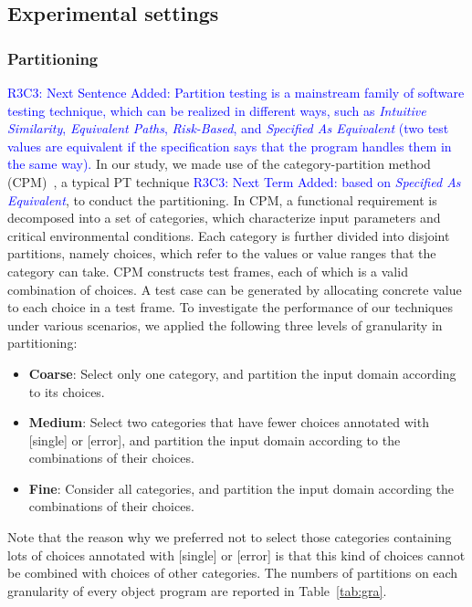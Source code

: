 \documentclass[10pt,journal,compsoc]{IEEEtran}
\begin{document}
\subsection{Experimental settings}

\subsubsection{Partitioning}

\textcolor{blue}{R3C3: Next Sentence Added: Partition testing is a mainstream family of software testing technique, which can be realized in different ways, such as \emph{Intuitive Similarity}, \emph{Equivalent Paths}, \emph{Risk-Based}, and \emph{Specified As Equivalent} (two test values are equivalent if the specification says that the program handles them in the same way).} In our study, we made use of the category-partition method (CPM)~\cite{Ostrand88}, a typical PT technique \textcolor{blue}{R3C3: Next Term Added: based on \emph{Specified As Equivalent}}, to conduct the partitioning. In CPM, a functional requirement is decomposed into a set of categories, which characterize input parameters and critical environmental conditions. Each category is further divided into disjoint partitions, namely choices, which refer to the values or value ranges that the category can take. CPM constructs test frames, each of which is a valid combination of choices. A test case can be generated by allocating concrete value to each choice in a test frame. To investigate the performance of our techniques under various scenarios, we applied the following three levels of granularity in partitioning:

\begin{itemize}
\item \textbf{Coarse}: Select only one category, and partition the input domain according to its choices.
\item \textbf{Medium}: Select two categories that have fewer choices annotated with [single] or [error], and partition the input domain according to the combinations of their choices.
\item \textbf{Fine}: Consider all categories, and partition the input domain according the combinations of their choices.
\end{itemize}

Note that the reason why we preferred not to select those categories containing lots of choices annotated with [single] or [error] is that this kind of choices cannot be combined with choices of other categories. The numbers of partitions on each granularity of every object program are reported in Table~\ref{tab:gra}.
\end{document}
